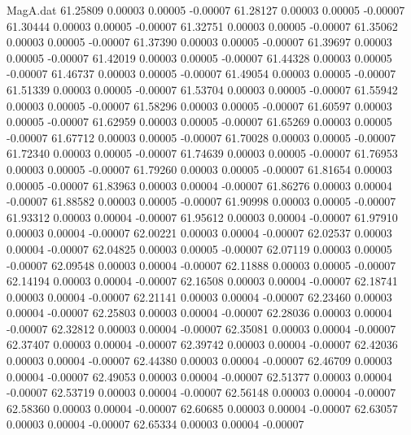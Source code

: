 \begin{filecontents}{MagA.dat}
  61.25809    0.00003    0.00005   -0.00007
  61.28127    0.00003    0.00005   -0.00007
  61.30444    0.00003    0.00005   -0.00007
  61.32751    0.00003    0.00005   -0.00007
  61.35062    0.00003    0.00005   -0.00007
  61.37390    0.00003    0.00005   -0.00007
  61.39697    0.00003    0.00005   -0.00007
  61.42019    0.00003    0.00005   -0.00007
  61.44328    0.00003    0.00005   -0.00007
  61.46737    0.00003    0.00005   -0.00007
  61.49054    0.00003    0.00005   -0.00007
  61.51339    0.00003    0.00005   -0.00007
  61.53704    0.00003    0.00005   -0.00007
  61.55942    0.00003    0.00005   -0.00007
  61.58296    0.00003    0.00005   -0.00007
  61.60597    0.00003    0.00005   -0.00007
  61.62959    0.00003    0.00005   -0.00007
  61.65269    0.00003    0.00005   -0.00007
  61.67712    0.00003    0.00005   -0.00007
  61.70028    0.00003    0.00005   -0.00007
  61.72340    0.00003    0.00005   -0.00007
  61.74639    0.00003    0.00005   -0.00007
  61.76953    0.00003    0.00005   -0.00007
  61.79260    0.00003    0.00005   -0.00007
  61.81654    0.00003    0.00005   -0.00007
  61.83963    0.00003    0.00004   -0.00007
  61.86276    0.00003    0.00004   -0.00007
  61.88582    0.00003    0.00005   -0.00007
  61.90998    0.00003    0.00005   -0.00007
  61.93312    0.00003    0.00004   -0.00007
  61.95612    0.00003    0.00004   -0.00007
  61.97910    0.00003    0.00004   -0.00007
  62.00221    0.00003    0.00004   -0.00007
  62.02537    0.00003    0.00004   -0.00007
  62.04825    0.00003    0.00005   -0.00007
  62.07119    0.00003    0.00005   -0.00007
  62.09548    0.00003    0.00004   -0.00007
  62.11888    0.00003    0.00005   -0.00007
  62.14194    0.00003    0.00004   -0.00007
  62.16508    0.00003    0.00004   -0.00007
  62.18741    0.00003    0.00004   -0.00007
  62.21141    0.00003    0.00004   -0.00007
  62.23460    0.00003    0.00004   -0.00007
  62.25803    0.00003    0.00004   -0.00007
  62.28036    0.00003    0.00004   -0.00007
  62.32812    0.00003    0.00004   -0.00007
  62.35081    0.00003    0.00004   -0.00007
  62.37407    0.00003    0.00004   -0.00007
  62.39742    0.00003    0.00004   -0.00007
  62.42036    0.00003    0.00004   -0.00007
  62.44380    0.00003    0.00004   -0.00007
  62.46709    0.00003    0.00004   -0.00007
  62.49053    0.00003    0.00004   -0.00007
  62.51377    0.00003    0.00004   -0.00007
  62.53719    0.00003    0.00004   -0.00007
  62.56148    0.00003    0.00004   -0.00007
  62.58360    0.00003    0.00004   -0.00007
  62.60685    0.00003    0.00004   -0.00007
  62.63057    0.00003    0.00004   -0.00007
  62.65334    0.00003    0.00004   -0.00007

\end{filecontents}
